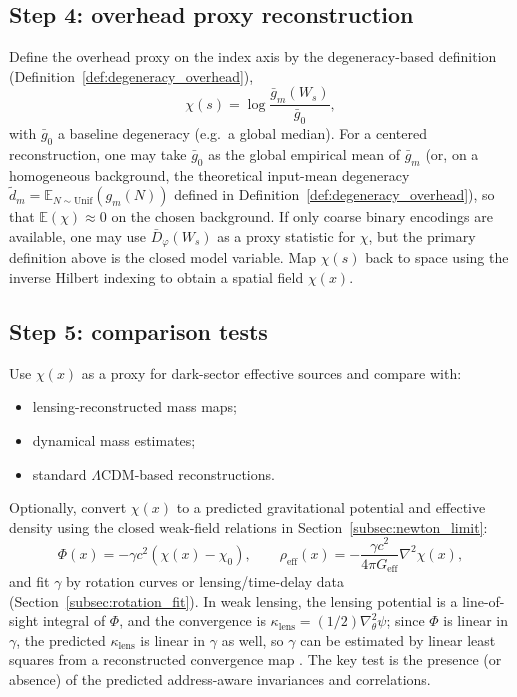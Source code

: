 \subsection{Step 4: overhead proxy reconstruction}
Define the overhead proxy on the index axis by the degeneracy-based definition (Definition~\ref{def:degeneracy_overhead}),
\[
\chi(s)=\log\frac{\bar{g}_m(W_s)}{\bar{g}_0},
\]
with $\bar{g}_0$ a baseline degeneracy (e.g.\ a global median).
For a centered reconstruction, one may take $\bar{g}_0$ as the global empirical mean of $\bar{g}_m$ (or, on a homogeneous background, the theoretical input-mean degeneracy $\tilde d_m=\mathbb{E}_{N\sim\mathrm{Unif}}(g_m(N))$ defined in Definition~\ref{def:degeneracy_overhead}), so that $\mathbb{E}(\chi)\approx 0$ on the chosen background.
If only coarse binary encodings are available, one may use $\bar{D}_\varphi(W_s)$ as a proxy statistic for $\chi$, but the primary definition above is the closed model variable.
Map $\chi(s)$ back to space using the inverse Hilbert indexing to obtain a spatial field $\chi(x)$.

\subsection{Step 5: comparison tests}
Use $\chi(x)$ as a proxy for dark-sector effective sources and compare with:
\begin{itemize}
\item lensing-reconstructed mass maps;
\item dynamical mass estimates;
\item standard $\Lambda$CDM-based reconstructions.
\end{itemize}
Optionally, convert $\chi(x)$ to a predicted gravitational potential and effective density using the closed weak-field relations in Section~\ref{subsec:newton_limit}:
\[
\Phi(x)= -\gamma c^2(\chi(x)-\chi_0),
\qquad
\rho_{\mathrm{eff}}(x)= -\frac{\gamma c^2}{4\pi G_{\mathrm{eff}}}\nabla^2\chi(x),
\]
and fit $\gamma$ by rotation curves or lensing/time-delay data (Section~\ref{subsec:rotation_fit}).
In weak lensing, the lensing potential is a line-of-sight integral of $\Phi$, and the convergence is $\kappa_{\mathrm{lens}}=(1/2)\nabla_\theta^2\psi$; since $\Phi$ is linear in $\gamma$, the predicted $\kappa_{\mathrm{lens}}$ is linear in $\gamma$ as well, so $\gamma$ can be estimated by linear least squares from a reconstructed convergence map \cite{BartelmannSchneider2001}.
The key test is the presence (or absence) of the predicted address-aware invariances and correlations.



